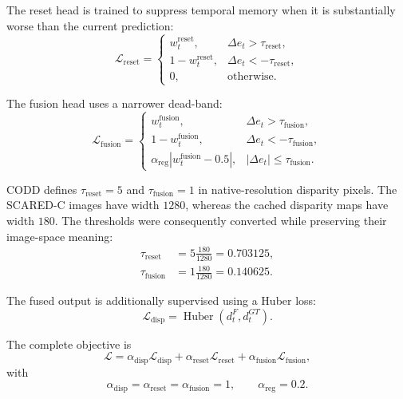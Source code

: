 \documentclass[11pt,a4paper]{article}
\begin{document}
The reset head is trained to suppress temporal memory when it is substantially worse than
the current prediction:
\begin{equation}
    \mathcal{L}_{\mathrm{reset}}
    =
    \begin{cases}
        w_t^{\mathrm{reset}},
        & \Delta e_t > \tau_{\mathrm{reset}},\\[1mm]
        1-w_t^{\mathrm{reset}},
        & \Delta e_t < -\tau_{\mathrm{reset}},\\[1mm]
        0,
        & \text{otherwise}.
    \end{cases}
    \label{eq:argos_reset_loss}
\end{equation}

The fusion head uses a narrower dead-band:
\begin{equation}
    \mathcal{L}_{\mathrm{fusion}}
    =
    \begin{cases}
        w_t^{\mathrm{fusion}},
        & \Delta e_t > \tau_{\mathrm{fusion}},\\[1mm]
        1-w_t^{\mathrm{fusion}},
        & \Delta e_t < -\tau_{\mathrm{fusion}},\\[1mm]
        \alpha_{\mathrm{reg}}
        \left|w_t^{\mathrm{fusion}}-0.5\right|,
        & \left|\Delta e_t\right|
          \leq \tau_{\mathrm{fusion}}.
    \end{cases}
    \label{eq:argos_fusion_loss}
\end{equation}

CODD defines
\(\tau_{\mathrm{reset}}=5\) and
\(\tau_{\mathrm{fusion}}=1\) in native-resolution disparity pixels.
The SCARED-C images have width \(1280\), whereas the cached disparity maps have width
\(180\). The thresholds were consequently converted while preserving their image-space
meaning:
\begin{align}
    \tau_{\mathrm{reset}}
    &=
    5\frac{180}{1280}
    =
    0.703125,
    \\
    \tau_{\mathrm{fusion}}
    &=
    1\frac{180}{1280}
    =
    0.140625.
\end{align}

The fused output is additionally supervised using a Huber loss:
\begin{equation}
    \mathcal{L}_{\mathrm{disp}}
    =
    \operatorname{Huber}
    \left(
        d_t^{F},
        d_t^{GT}
    \right).
\end{equation}

The complete objective is
\begin{equation}
    \mathcal{L}
    =
    \alpha_{\mathrm{disp}}\mathcal{L}_{\mathrm{disp}}
    +
    \alpha_{\mathrm{reset}}\mathcal{L}_{\mathrm{reset}}
    +
    \alpha_{\mathrm{fusion}}\mathcal{L}_{\mathrm{fusion}},
    \label{eq:argos_codd_total_loss}
\end{equation}
with
\begin{equation}
    \alpha_{\mathrm{disp}}
    =
    \alpha_{\mathrm{reset}}
    =
    \alpha_{\mathrm{fusion}}
    =
    1,
    \qquad
    \alpha_{\mathrm{reg}}=0.2.
\end{equation}
\end{document}
